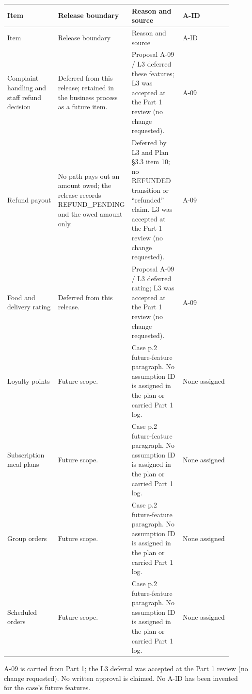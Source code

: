 \begin{longtable}{>{\raggedright\arraybackslash}p{0.2300\linewidth}>{\raggedright\arraybackslash}p{0.2300\linewidth}>{\raggedright\arraybackslash}p{0.2300\linewidth}>{\raggedright\arraybackslash}p{0.2300\linewidth}}
Item & Release boundary & Reason and source & A-ID \\
\hline\endfirsthead
Item & Release boundary & Reason and source & A-ID \\
\hline\endhead
Complaint handling and staff refund decision & Deferred from this release; retained in the business process as a future item. & Proposal A-09 / L3 deferred these features; L3 was accepted at the Part 1 review (no change requested). & A-09 \\
Refund payout & No path pays out an amount owed; the release records REFUND\_PENDING and the owed amount only. & Deferred by L3 and Plan \S{}3.3 item 10; no REFUNDED transition or ``refunded'' claim. L3 was accepted at the Part 1 review (no change requested). & A-09 \\
Food and delivery rating & Deferred from this release. & Proposal A-09 / L3 deferred rating; L3 was accepted at the Part 1 review (no change requested). & A-09 \\
Loyalty points & Future scope. & Case p.2 future-feature paragraph. No assumption ID is assigned in the plan or carried Part 1 log. & None assigned \\
Subscription meal plans & Future scope. & Case p.2 future-feature paragraph. No assumption ID is assigned in the plan or carried Part 1 log. & None assigned \\
Group orders & Future scope. & Case p.2 future-feature paragraph. No assumption ID is assigned in the plan or carried Part 1 log. & None assigned \\
Scheduled orders & Future scope. & Case p.2 future-feature paragraph. No assumption ID is assigned in the plan or carried Part 1 log. & None assigned \\
\end{longtable}
A-09 is carried from Part 1; the L3 deferral was accepted at the Part 1 review (no change requested). No written approval is claimed. No A-ID has been invented for the case's future features.
